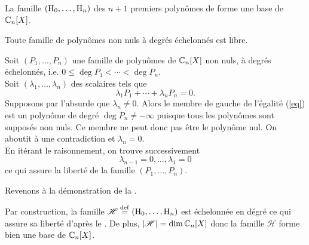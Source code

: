 \begin{prop} 
    La famille $(\mathrm{H}_0, \dots, \mathrm{H}_n)$ des $n+1$ premiers polynômes de  forme une base de $\mathbb{C}_n[X]$.
\end{prop}

\begin{lemme} 
    Toute famille de polynômes non nuls à degrés échelonnés est libre.
\end{lemme}

\begin{demo}
    Soit $(P_1, \dots, P_n)$ une famille de polynômes de $\mathbb{C}_n[X]$ non nuls, à degrés échelonnés, i.e. $0 \leqslant \deg P_1 < \cdots < \deg P_n$. \\
    Soit $(\lambda_1, \dots, \lambda_n)$ des scalaires tels que
    \begin{equation}\tag{$\star$} \label{eq}
        \lambda_1 P_1 + \cdots + \lambda_n P_n = 0.
    \end{equation}
    Supposons par l'absurde que $\lambda_n \not= 0$. Alors le membre de gauche de l'égalité (\ref{eq}) est un polynôme de degré $\deg P_n \not= - \infty$ puisque tous les polynômes sont supposés non nuls. Ce membre ne peut donc pas être le polynôme nul. On aboutit à une contradiction et $\lambda_n = 0$. \\ 
    En itérant le raisonnement, on trouve successivement 
    $$\lambda_{n-1} = 0, \dots, \lambda_1 = 0$$
    ce qui assure la liberté de la famille $(P_1, \dots, P_n)$.
\end{demo}


Revenons à la démonstration de la .

\begin{demo}
    Par construction, la famille $\mathscr{H} \overset{\mathrm{\tiny def}}{=} (\mathrm{H}_0, \dots, \mathrm{H}_n)$ est échelonnée en dégré \note ce qui assure sa liberté d'après le . De plus, $|\mathscr{H}| = \dim \mathbb{C}_n[X]$ donc la famille $\mathscr{H}$ forme bien une base de $\mathbb{C}_n[X]$.
\end{demo}